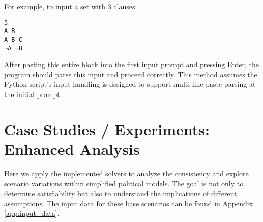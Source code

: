 \documentclass[11pt, a4paper]{article}
\begin{document}
For example, to input a set with 3 clauses:
\begin{verbatim}
3
A B
A B C
¬A ¬B
\end{verbatim}
After pasting this entire block into the first input prompt and pressing Enter, the program should parse this input and proceed correctly. This method assumes the Python script's input handling is designed to support multi-line paste parsing at the initial prompt.

\section{Case Studies / Experiments: Enhanced Analysis} \label{sec:casestudies}

Here we apply the implemented solvers to analyze the consistency and explore scenario variations within simplified political models. The goal is not only to determine satisfiability but also to understand the implications of different assumptions. The input data for these base scenarios can be found in Appendix \ref{app:input_data}.
\end{document}
